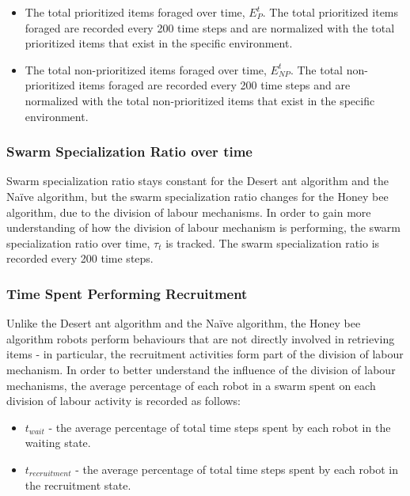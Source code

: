 \begin{itemize}
\item The total prioritized items foraged over time, $E^t_P$. The total prioritized items foraged are recorded every 200 time steps and are normalized with the total prioritized items that exist in the specific environment.
\item The total non-prioritized items foraged over time, $E^t_{NP}$. The total non-prioritized items foraged are recorded every 200 time steps and are normalized with the total non-prioritized items that exist in the specific environment.
\end{itemize}

\subsubsection{Swarm Specialization Ratio over time}
Swarm specialization ratio stays constant for the Desert ant algorithm and the Na\"ive algorithm, but the swarm specialization ratio changes for the Honey bee algorithm, due to the division of labour mechanisms. In order to gain more understanding of how the division of labour mechanism is performing, the swarm specialization ratio over time, $\tau_t$ is tracked. The swarm specialization ratio is recorded every 200 time steps.

\subsubsection{Time Spent Performing Recruitment}
Unlike the Desert ant algorithm and the Na\"ive algorithm, the Honey bee algorithm robots perform behaviours that are not directly involved in retrieving items - in particular, the recruitment activities form part of the division of labour mechanism. In order to better understand the influence of the division of labour mechanisms, the average percentage of each robot in a swarm spent on each division of labour activity is recorded as follows:

\begin{itemize}
\item $t_{wait}$ - the average percentage of total time steps spent by each robot in the waiting state.
\item $t_{recruitment}$ - the average percentage of total time steps spent by each robot in the recruitment state.
\end{itemize}



